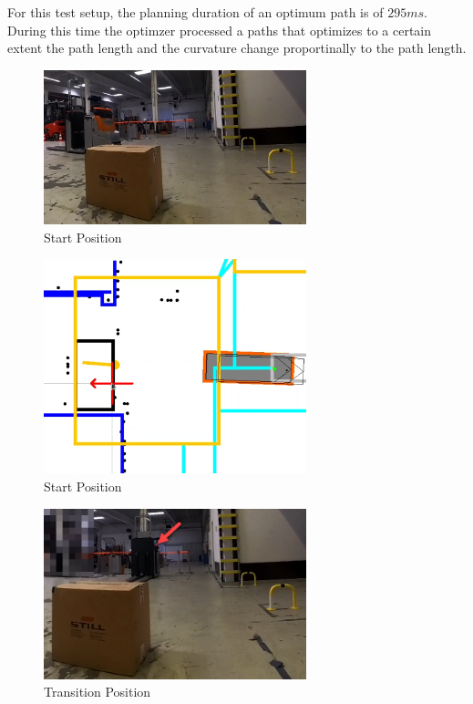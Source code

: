 For this test setup, the planning duration of an optimum path is of \(295ms\). During this time
the optimzer processed a paths that optimizes to a certain extent the path length and 
the curvature change proportinally to the path length.

\begin{figure}[H]
    \begin{center}
        \includegraphics[width=3in]{images/Chap3/Test3/Start_real.png} %
        \caption{Start Position}
        \label{OptResult18}
        \end{center}    
\end{figure}

\begin{figure}[H]
    \begin{center}
        \includegraphics[width=3in]{images/Chap3/Test3/Start_simu.png} %
        \caption{Start Position}
        \label{OptResult19}
        \end{center}    
\end{figure}

\begin{figure}[H]
    \begin{center}
        \includegraphics[width=3in]{images/Chap3/Test3/Transition_real.png} %
        \caption{Transition Position}
        \label{OptResult20}
        \end{center}    
\end{figure}

